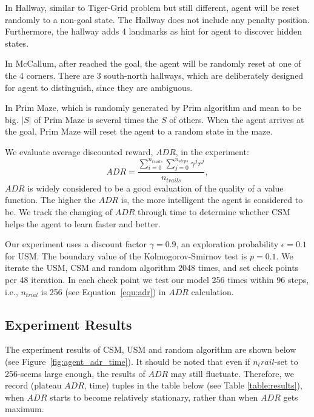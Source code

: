 \documentclass{article}
\begin{document}
In Hallway, similar to Tiger-Grid problem but still different, agent will be reset randomly
to a non-goal state. The Hallway does not include any penalty position. Furthermore, the hallway
adds 4 landmarks as hint for agent to discover hidden states.

In McCallum, after reached the goal, the agent will be randomly reset at one of the 4 corners.
There are 3 south-north hallways, which are deliberately designed for agent to distinguish, since
they are ambiguous. 

In Prim Maze, which is randomly generated by Prim algorithm and mean to be big. $|S|$ of Prim Maze
is several times the $S$ of others. When the agent arrives at the goal, Prim Maze will reset
the agent to a random state in the maze.

We evaluate average discounted reward, $ADR$, in the experiment:
\begin{equation}
  ADR = \frac{\sum_{i=0}^{n_{trails}} \sum_{j=0}^{n_{steps}} \gamma^j r^j}{n_{trails}}, \label{equ:adr}
\end{equation}
$ADR$ is widely considered to be a good evaluation of the quality of a value function. The higher
the $ADR$ is, the more intelligent the agent is considered to be. We track the changing of $ADR$ through time
to determine whether CSM helps the agent to learn faster and better.
  
Our experiment uses a discount factor $\gamma=0.9$, an exploration probability $\epsilon=0.1$ for USM.
The boundary value of the Kolmogorov-Smirnov test is $p=0.1$. We iterate the USM, CSM and random algorithm
2048 times, and set check points per 48 iteration. In each check point we test our model 256 times
within 96 steps, i.e., $n_{trial}$ is 256 (see Equation~\ref{equ:adr}) in $ADR$ calculation.

\subsection{Experiment Results}

The experiment results of CSM, USM and random algorithm are shown below (see Figure~\ref{fig:agent_adr_time}).
It should be noted that even if $n_trail$-set to 256-seems large enough, the results of $ADR$ may still fluctuate.
Therefore, we record (plateau $ADR$, time) tuples in the table below (see Table \ref{table:results}), when $ADR$ starts to become relatively stationary, rather than when $ADR$ gets maximum. 
\end{document}
